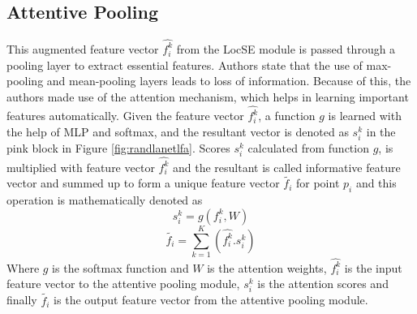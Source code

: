 \subsection{Attentive Pooling}
This augmented feature vector $\hat{f_i^k}$ from the LocSE module is passed through a pooling layer to extract essential features.
Authors state that the use of max-pooling and mean-pooling layers leads to loss of information. Because of this, the authors made use of the attention mechanism, which helps in learning important features automatically.
Given the feature vector $\hat{f_i^k}$, a function $g$ is learned with the help of MLP and softmax, and the resultant vector is denoted as $s_i^k$ in the pink block in Figure \ref{fig:randlanetlfa}.
Scores $s_i^k$ calculated from function $g$, is multiplied with feature vector $\hat{f_i^k}$ and the resultant is called informative feature vector and summed up to form a unique feature vector $\tilde{f_i}$ for point $p_i$ and this operation is mathematically denoted as
$$
s_i^k = g(f_i^k, W)
$$
$$
\tilde{f_i}= \sum_{k=1}^K (\hat{f_i^k}.s_i^k)
$$
Where $g$ is the softmax function and $W$ is the attention weights, $\hat{f_i^k}$ is the input feature vector to the attentive pooling module, $s_i^k$ is the attention scores and finally $\tilde{f_i}$ is the output feature vector from the attentive pooling module.

